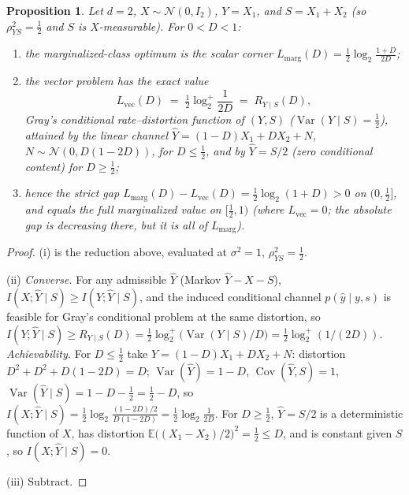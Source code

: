 \documentclass[11pt,onecolumn]{IEEEtran}
\newtheorem{proposition}[theorem]{Proposition}
\newcommand{\E}{\mathbb{E}}
\newcommand{\Cov}{\operatorname{Cov}}
\newcommand{\hY}{\widehat{Y}}
\begin{document}
\begin{proposition}\label{prop:marg}
Let $d=2$, $X\sim\mathcal N(0,I_2)$, $Y=X_1$, and $S=X_1+X_2$ (so
$\rho_{YS}^2=\tfrac12$ and $S$ is $X$-measurable). For $0<D<1$:
\begin{enumerate}
\item[(i)] the marginalized-class optimum is the scalar corner
$L_{\mathrm{marg}}(D)=\tfrac12\log_2\!\frac{1+D}{2D}$;
\item[(ii)] the vector problem has the exact value
\[
L_{\mathrm{vec}}(D)\;=\;\tfrac12\log_2^{+}\!\frac{1}{2D}
\;=\;R_{Y\mid S}(D),
\]
Gray's conditional rate--distortion function of $(Y,S)$ \cite{gray1973}
($\operatorname{Var}(Y\mid S)=\tfrac12$), attained by the linear channel
$\hY=(1-D)X_1+DX_2+N$, $N\sim\mathcal N(0,D(1-2D))$, for $D\le\tfrac12$,
and by $\hY=S/2$ (zero conditional content) for $D\ge\tfrac12$;
\item[(iii)] hence the strict gap
$L_{\mathrm{marg}}(D)-L_{\mathrm{vec}}(D)=\tfrac12\log_2(1+D)>0$ on
$(0,\tfrac12]$, and equals the full marginalized value on
$[\tfrac12,1)$ (where $L_{\mathrm{vec}}=0$; the absolute gap is decreasing
there, but it is all of $L_{\mathrm{marg}}$).
\end{enumerate}
\end{proposition}

\begin{proof}
(i) is the reduction above, evaluated at $\sigma^2=1$,
$\rho_{YS}^2=\tfrac12$.

(ii) \emph{Converse.} For any admissible $\hY$ (Markov $\hY-X-S$),
$I(X;\hY\mid S)\ge I(Y;\hY\mid S)$, and the induced conditional channel
$p(\hat y\mid y,s)$ is feasible for Gray's conditional problem at the same
distortion, so $I(Y;\hY\mid S)\ge R_{Y\mid S}(D)=\tfrac12\log_2^{+}
\bigl(\operatorname{Var}(Y\mid S)/D\bigr)=\tfrac12\log_2^{+}(1/(2D))$.
\emph{Achievability.} For $D\le\tfrac12$ take
$\hY=(1-D)X_1+DX_2+N$: distortion $D^2+D^2+D(1-2D)=D$;
$\operatorname{Var}(\hY)=1-D$, $\Cov(\hY,S)=1$,
$\operatorname{Var}(\hY\mid S)=1-D-\tfrac12=\tfrac12-D$, so
$I(X;\hY\mid S)=\tfrac12\log_2\frac{(1-2D)/2}{D(1-2D)}
=\tfrac12\log_2\frac1{2D}$. For $D\ge\tfrac12$, $\hY=S/2$ is a
deterministic function of $X$, has distortion
$\E\bigl((X_1-X_2)/2\bigr)^2=\tfrac12\le D$, and is constant given $S$, so
$I(X;\hY\mid S)=0$.

(iii) Subtract.
\end{proof}
\end{document}
